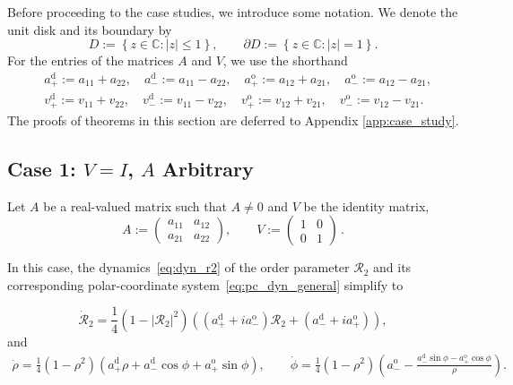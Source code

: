 \documentclass[10pt]{article}
\theoremstyle{definition}
\theoremstyle{definition}
\numberwithin{equation}{section}
\newcommand{\BBS}{\mathbb{S}}
\newcommand{\BBC}{\mathbb{C}}
\newcommand{\CR}{\mathcal{R}}
\newcommand{\CD}{\mathcal{D}}
\newcommand{\aDPlus}{a_+^{\text{d}}}
\newcommand{\aDMinus}{a_-^{\text{d}}}
\newcommand{\aOPlus}{a_+^{\text{o}}}
\newcommand{\aOMinus}{a_-^{\text{o}}}
\newcommand{\vDPlus}{v_+^{\text{d}}}
\newcommand{\vDMinus}{v_-^{\text{d}}}
\newcommand{\vOPlus}{v_+^{\text{o}}}
\newcommand{\vOMinus}{v_-^{\text{o}}}
\newcommand{\Drho}{\Dot{\rho}}
\newcommand{\Dphi}{\Dot{\phi}}
\begin{document}
Before proceeding to the case studies, we introduce some notation.
We denote the unit disk and its boundary by
\begin{equation}
D := \left\{ z \in \BBC : |z| \leq 1 \right\}, \qquad \partial D := \left\{ z \in \BBC : |z| = 1 \right\} .
\end{equation}
For the entries of the matrices $A$ and $V$, we use the shorthand
\begin{equation*}
\begin{aligned}
&\aDPlus := a_{11} + a_{22}, \quad \aDMinus := a_{11} - a_{22}, \quad \aOPlus := a_{12} + a_{21}, \quad \aOMinus := a_{12} - a_{21},\\[5pt]
&\vDPlus := v_{11} + v_{22}, \quad \vDMinus := v_{11} - v_{22}, \quad \vOPlus := v_{12} + v_{21}, \quad \vOMinus := v_{12} - v_{21}.
\end{aligned}
\end{equation*}
The proofs of theorems in this section are deferred to Appendix \ref{app:case_study}.


\subsection{Case 1: \texorpdfstring{$V = I$, $A$}{VA} Arbitrary}
\label{sec:th_case1}

Let $A$ be a real-valued matrix such that $A \neq 0$ and $V$ be the identity matrix, 
\begin{equation}\label{eq:matrices_A_V_case_1}
A := \left(\begin{array}{ll}
    a_{11} & a_{12} \\
    a_{21} & a_{22} 
\end{array} \right), \qquad V := \left( \begin{array}{ll}
    1 & 0  \\
    0 & 1 
\end{array} \right) \,.
\end{equation}

In this case, the dynamics~\eqref{eq:dyn_r2} of the order parameter $\CR_2$ and its corresponding polar-coordinate system~\eqref{eq:pc_dyn_general} simplify to

\begin{equation}\label{eq:OAcase1}
\Dot{\CR}_2 = \frac{1}{4} \left( 1 - |\CR_2|^2 \right) \left( \left(\aDPlus + i\aOMinus \right) \CR_2 + \left( \aDMinus + i\aOPlus \right) \right),
\end{equation}
and
\begin{equation}\label{eq:pc_dyn_case_1}
\begin{aligned}
\Drho = \frac{1}{4} (1-\rho^2) \left( \aDPlus \rho + \aDMinus\cos \phi + \aOPlus \sin \phi \right), \qquad 
\Dphi = \frac{1}{4} (1-\rho^2) \left(\aOMinus - \frac{\aDMinus \sin \phi - \aOPlus \cos \phi}{\rho} \right) .
\end{aligned}
\end{equation}
\end{document}
